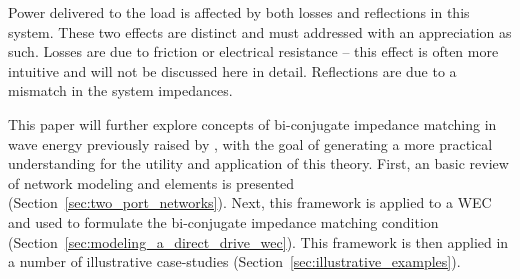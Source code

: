 \documentclass[lettersize,journal]{IEEEtran}
\begin{document}
Power delivered to the load is affected by both losses and reflections in this system.
These two effects are distinct and must addressed with an appreciation as such.
Losses are due to friction or electrical resistance -- this effect is often more intuitive and will not be discussed here in detail.
Reflections are due to a mismatch in the system impedances.

This paper will further explore concepts of bi-conjugate impedance matching in wave energy previously raised by \cite{Bacelli:2021aa}, with the goal of generating a more practical understanding for the utility and application of this theory.
First, an basic review of network modeling and elements is presented (Section~\ref{sec:two_port_networks}).
Next, this framework is applied to a WEC and used to formulate the bi-conjugate impedance matching condition (Section~\ref{sec:modeling_a_direct_drive_wec}).
This framework is then applied in a number of illustrative case-studies (Section~\ref{sec:illustrative_examples}).





\end{document}
